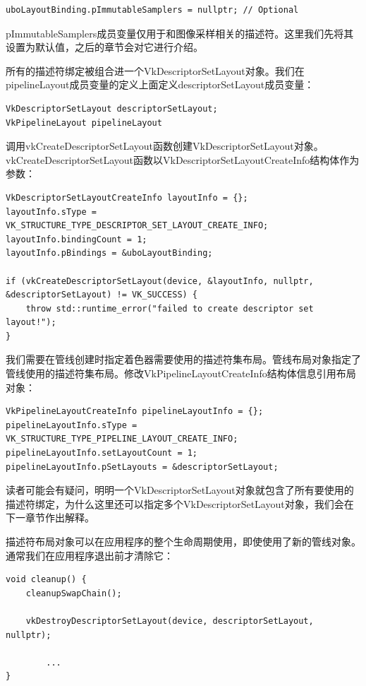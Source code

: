 \documentclass{ctexart}
\begin{document}
\begin{lstlisting}[language={[ANSI]C}]
uboLayoutBinding.pImmutableSamplers = nullptr; // Optional
\end{lstlisting}

pImmutableSamplers成员变量仅用于和图像采样相关的描述符。这里我们先将其设置为默认值，之后的章节会对它进行介绍。

所有的描述符绑定被组合进一个VkDescriptorSetLayout对象。我们在pipelineLayout成员变量的定义上面定义descriptorSetLayout成员变量：

\begin{lstlisting}[language={[ANSI]C}]
VkDescriptorSetLayout descriptorSetLayout;
VkPipelineLayout pipelineLayout
\end{lstlisting}

调用vkCreateDescriptorSetLayout函数创建VkDescriptorSetLayout对象。vkCreateDescriptorSetLayout函数以VkDescriptorSetLayoutCreateInfo结构体作为参数：

\begin{lstlisting}[language={[ANSI]C}]
VkDescriptorSetLayoutCreateInfo layoutInfo = {};
layoutInfo.sType = VK_STRUCTURE_TYPE_DESCRIPTOR_SET_LAYOUT_CREATE_INFO;
layoutInfo.bindingCount = 1;
layoutInfo.pBindings = &uboLayoutBinding;

if (vkCreateDescriptorSetLayout(device, &layoutInfo, nullptr,	 &descriptorSetLayout) != VK_SUCCESS) {
	throw std::runtime_error("failed to create descriptor set layout!");
}
\end{lstlisting}

我们需要在管线创建时指定着色器需要使用的描述符集布局。管线布局对象指定了管线使用的描述符集布局。修改VkPipelineLayoutCreateInfo结构体信息引用布局对象：

\begin{lstlisting}[language={[ANSI]C}]
VkPipelineLayoutCreateInfo pipelineLayoutInfo = {};
pipelineLayoutInfo.sType = VK_STRUCTURE_TYPE_PIPELINE_LAYOUT_CREATE_INFO;
pipelineLayoutInfo.setLayoutCount = 1;
pipelineLayoutInfo.pSetLayouts = &descriptorSetLayout;
\end{lstlisting}

读者可能会有疑问，明明一个VkDescriptorSetLayout对象就包含了所有要使用的描述符绑定，为什么这里还可以指定多个VkDescriptorSetLayout对象，我们会在下一章节作出解释。

描述符布局对象可以在应用程序的整个生命周期使用，即使使用了新的管线对象。通常我们在应用程序退出前才清除它：

\begin{lstlisting}[language={[ANSI]C}]
void cleanup() {
	cleanupSwapChain();

	vkDestroyDescriptorSetLayout(device, descriptorSetLayout, nullptr);

		...
}
\end{lstlisting}
\end{document}

